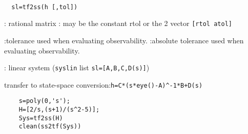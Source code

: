\begin{mandesc}
   \\ %
\end{mandesc}
\begin{calling_sequence}
\begin{verbatim}
  sl=tf2ss(h [,tol])  
\end{verbatim}
\end{calling_sequence}
\begin{parameters}
  \begin{varlist}
    : rational matrix
    : may be the constant rtol or the 2 vector \verb![rtol atol]!
    \begin{varlist}
      :tolerance used when evaluating observability.
      :absolute tolerance used when evaluating observability.
    \end{varlist}
    : linear system (\verb!syslin! list \verb!sl=[A,B,C,D(s)]!)
  \end{varlist}
\end{parameters}
\begin{mandescription}
  transfer to state-space conversion:\verb!h=C*(s*eye()-A)^-1*B+D(s)!
\end{mandescription}
\begin{examples}
  \begin{Verbatim}
    s=poly(0,'s');
    H=[2/s,(s+1)/(s^2-5)];
    Sys=tf2ss(H)
    clean(ss2tf(Sys))
  \end{Verbatim}
\end{examples}
\begin{manseealso}
      
\end{manseealso}
